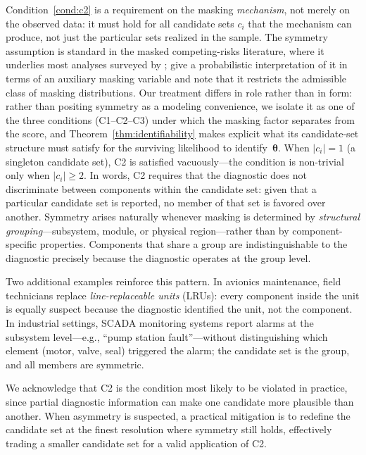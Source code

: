 \documentclass[11pt]{article}
\theoremstyle{definition}
\theoremstyle{plain}
\renewcommand{\v}[1]{\boldsymbol{#1}}
\newcommand{\btheta}{\v{\theta}}
\begin{document}
Condition~\ref{cond:c2} is a requirement on the masking \emph{mechanism},
not merely on the observed data: it must hold for all candidate sets
$c_i$ that the mechanism can produce, not just the particular sets
realized in the sample.
The symmetry assumption is standard in the masked competing-risks
literature, where it underlies most analyses surveyed by
\citet{sen2001masked}; \citet{yu2010conditional} give a probabilistic
interpretation of it in terms of an auxiliary masking variable and note
that it restricts the admissible class of masking distributions.
Our treatment differs in role rather than in form: rather than positing
symmetry as a modeling convenience, we isolate it as one of the three
conditions (C1--C2--C3) under which the masking factor separates from
the score, and Theorem~\ref{thm:identifiability} makes explicit what its
candidate-set structure must satisfy for the surviving likelihood to
identify~$\btheta$.
When $|c_i| = 1$ (a singleton candidate set), C2 is satisfied
vacuously---the condition is non-trivial only when $|c_i| \geq 2$.
In words, C2 requires that the diagnostic does not
discriminate between components within the candidate set: given that a
particular candidate set is reported, no member of that set is favored
over another.
Symmetry arises naturally whenever masking is determined by
\emph{structural grouping}---subsystem, module, or physical
region---rather than by component-specific properties.
Components that share a group are indistinguishable to the diagnostic
precisely because the diagnostic operates at the group level.

Two additional examples reinforce this pattern.
In avionics maintenance, field technicians replace
\emph{line-replaceable units} (LRUs): every component inside the unit is
equally suspect because the diagnostic identified the unit, not the
component.
In industrial settings, SCADA monitoring systems report alarms at the
subsystem level---e.g., ``pump station fault''---without distinguishing
which element (motor, valve, seal) triggered the alarm; the candidate
set is the group, and all members are symmetric.

We acknowledge that C2 is the condition most likely to be violated in
practice, since partial diagnostic information can make one candidate
more plausible than another.
When asymmetry is suspected, a practical mitigation is to redefine
the candidate set at the finest resolution where symmetry still holds,
effectively trading a smaller candidate set for a valid application of
C2.
\end{document}
